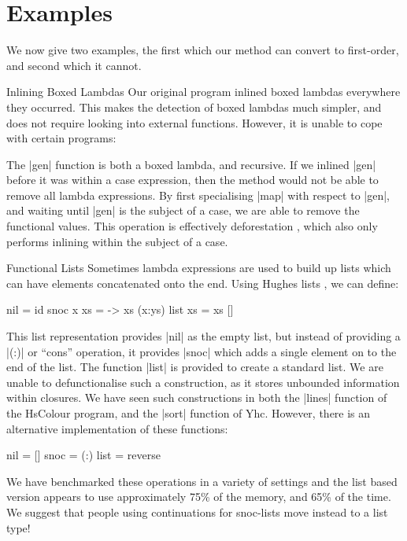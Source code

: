 \documentclass[preprint]{sigplanconf}
\begin{document}
\section{Examples}
\label{sec:examples}

We now give two examples, the first which our method can convert to first-order, and second which it cannot.

\begin{examplename}{Inlining Boxed Lambdas}
\label{ex:inlining_boxed_lambdas}
Our original program inlined boxed lambdas everywhere they occurred. This makes the detection of boxed lambdas much simpler, and does not require looking into external functions. However, it is unable to cope with certain programs:


The |gen| function is both a boxed lambda, and recursive. If we inlined |gen| before it was within a case expression, then the method would not be able to remove all lambda expressions. By first specialising |map| with respect to |gen|, and waiting until |gen| is the subject of a case, we are able to remove the functional values. This operation is effectively deforestation \cite{wadler:deforestation}, which also only performs inlining within the subject of a case.
\end{examplename}

\begin{examplename}{Functional Lists}
\label{ex:functional_lists}
Sometimes lambda expressions are used to build up lists which can have elements concatenated onto the end. Using Hughes lists \cite{hughes:lists}, we can define:

\begin{code}
nil = id
snoc x xs = \ys -> xs (x:ys)
list xs = xs []
\end{code}

This list representation provides |nil| as the empty list, but instead of providing a |(:)| or ``cons'' operation, it provides |snoc| which adds a single element on to the end of the list. The function |list| is provided to create a standard list. We are unable to defunctionalise such a construction, as it stores unbounded information within closures. We have seen such constructions in both the |lines| function of the HsColour program, and the |sort| function of Yhc. However, there is an alternative implementation of these functions:

\begin{code}
nil = []
snoc = (:)
list = reverse
\end{code}

We have benchmarked these operations in a variety of settings and the list based version appears to use approximately 75\% of the memory, and 65\% of the time. We suggest that people using continuations for snoc-lists move instead to a list type!
\end{examplename}
\end{document}
